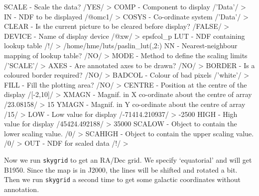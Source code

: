 \documentclass[11pt,noabs]{starlink}
\begin{document}
\begin{terminalv}
SCALE - Scale the data? /YES/ >
COMP - Component to display /'Data'/ >
IN - NDF to be displayed /@omc1/ >
COSYS - Co-ordinate system /'Data'/ >
CLEAR - Is the current picture to be cleared before display? /FALSE/ >
DEVICE - Name of display device /@xw/ > epsfcol_p
LUT - NDF containing lookup table /!/ > /home/hme/luts/paslin_lut(,2:)
NN - Nearest-neighbour mapping of lookup table? /NO/ >
MODE - Method to define the scaling limits /'SCALE'/ >
AXES - Are annotated axes to be drawn? /NO/ >
BORDER - Is a coloured border required? /NO/ >
BADCOL - Colour of bad pixels /'white'/ >
FILL - Fill the plotting area? /NO/ >
CENTRE - Position at the centre of the display /[-2,10]/ >
XMAGN - Magnif. in X co-ordinate about the centre of array /23.08158/ > 15
YMAGN - Magnif. in Y co-ordinate about the centre of array /15/ >
LOW - Low value for display /-71414.210937/ > -2500
HIGH - High value for display /45424.492188/ > 35000
SCALOW - Object to contain the lower scaling value. /0/ >
SCAHIGH - Object to contain the upper scaling value. /0/ >
OUT - NDF for scaled data /!/ >
\end{terminalv}

   Now we run \texttt{skygrid} to get an RA/Dec grid. We specify
   `equatorial' and will get B1950. Since the map is in J2000, the lines
   will be shifted and rotated a bit. Then we run \texttt{skygrid} a
   second time to get some galactic coordinates without annotation.
\end{document}
